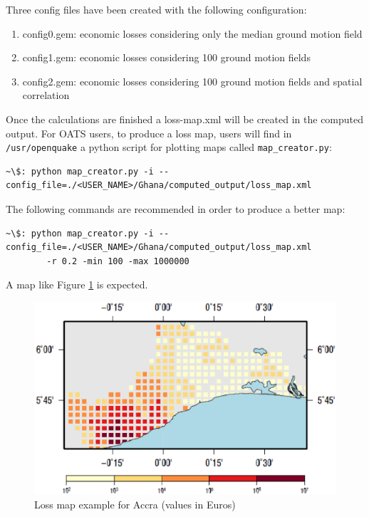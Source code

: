 Three config files have been created with the following configuration:
\begin{enumerate}
\item config0.gem: economic losses considering only the median ground motion field
\item config1.gem: economic losses considering 100 ground motion fields
\item config2.gem: economic losses considering 100 ground motion fields and spatial correlation
\end{enumerate}

Once the calculations are finished a loss-map.xml will be created in 
the computed output. For OATS users, to produce a loss map, users will find 
in \texttt{/usr/openquake} a python script for plotting maps called 
\texttt{map\_creator.py}:
\begin{Verbatim}[frame=single, commandchars=\\\{\}, fontsize=\scriptsize]
   ~\$: python map_creator.py -i --config_file=./<USER_NAME>/Ghana/computed_output/loss_map.xml
\end{Verbatim}

The following commands are recommended in order to produce a better map:
\begin{Verbatim}[frame=single, commandchars=\\\{\}, fontsize=\scriptsize]
   ~\$: python map_creator.py -i --config_file=./<USER_NAME>/Ghana/computed_output/loss_map.xml 
        -r 0.2 -min 100 -max 1000000
\end{Verbatim}

A map like Figure \ref{fig:Ghana_Output} is expected.
\begin{figure}[htb]
	\centering
    \includegraphics[width=\textwidth]{./figures/Ghana_risk_example_output.eps}
        \caption{Loss map example for Accra (values in Euros)}
	\label{fig:Ghana_Output}
\end{figure}

